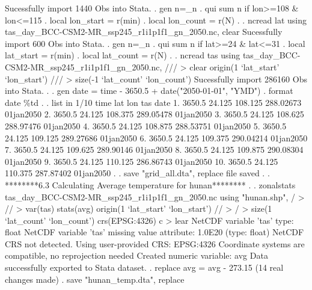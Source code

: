 Sucessfully import 1440 Obs into Stata.
{\smallskip}
. gen n=_n 
{\smallskip}
. qui sum n if lon>=108 \& lon<=115
{\smallskip}
. local lon_start = r(min)
{\smallskip}
. local lon_count = r(N)
{\smallskip}
. 
. ncread lat using tas_day_BCC-CSM2-MR_ssp245_r1i1p1f1_gn_2050.nc, clear 
Sucessfully import 600 Obs into Stata.
{\smallskip}
. gen n=_n 
{\smallskip}
. qui sum n if lat>=24 \& lat<=31
{\smallskip}
. local lat_start = r(min)
{\smallskip}
. local lat_count = r(N)
{\smallskip}
. 
. ncread tas using tas_day_BCC-CSM2-MR_ssp245_r1i1p1f1_gn_2050.nc, ///
>                         clear origin(1 `lat_start' `lon_start') ///
>                         size(-1 `lat_count' `lon_count')
{\smallskip}
{\smallskip}
Sucessfully import 286160 Obs into Stata.
{\smallskip}
. 
. gen date = time - 3650.5  + date("2050-01-01", "YMD")
{\smallskip}
. format date \%td
{\smallskip}
. 
. list in 1/10
{\smallskip}
     {\TLC}
     {\VBAR}   time      lat       lon         tas        date {\VBAR}
     {\LFTT}
  1. {\VBAR} 3650.5   24.125   108.125   288.02673   01jan2050 {\VBAR}
  2. {\VBAR} 3650.5   24.125   108.375   289.05478   01jan2050 {\VBAR}
  3. {\VBAR} 3650.5   24.125   108.625   288.97476   01jan2050 {\VBAR}
  4. {\VBAR} 3650.5   24.125   108.875   288.53751   01jan2050 {\VBAR}
  5. {\VBAR} 3650.5   24.125   109.125   289.27686   01jan2050 {\VBAR}
     {\LFTT}
  6. {\VBAR} 3650.5   24.125   109.375   290.04214   01jan2050 {\VBAR}
  7. {\VBAR} 3650.5   24.125   109.625   289.90146   01jan2050 {\VBAR}
  8. {\VBAR} 3650.5   24.125   109.875   290.08304   01jan2050 {\VBAR}
  9. {\VBAR} 3650.5   24.125   110.125   286.86743   01jan2050 {\VBAR}
 10. {\VBAR} 3650.5   24.125   110.375   287.87402   01jan2050 {\VBAR}
     {\BLC}
{\smallskip}
. 
. save "grid_all.dta", replace
file{} saved
{\smallskip}
. 
. ********6.3 Calculating Average temperature for hunan********
. 
. zonalstats tas_day_BCC-CSM2-MR_ssp245_r1i1p1f1_gn_2050.nc using "hunan.shp", /
> //
>                       var(tas) stats(avg) origin(1 `lat_start' `lon_start') //
> /
>                               size(1 `lat_count' `lon_count') crs(EPSG:4326) c
> lear
NetCDF variable 'tas' type: float
NetCDF variable 'tas' missing value attribute: 1.0E20 (type: float)
NetCDF CRS not detected. Using user-provided CRS: EPSG:4326
Coordinate systems are compatible, no reprojection needed
Created numeric variable: avg
Data successfully exported to Stata dataset.
{\smallskip}
. replace avg = avg - 273.15
(14 real changes made)
{\smallskip}
. save "hunan_temp.dta", replace
